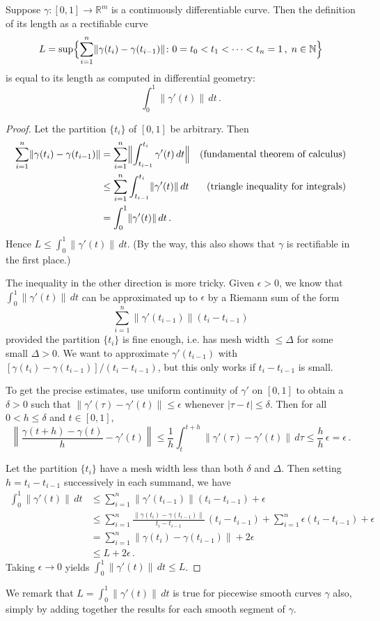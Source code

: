 \documentclass[12pt]{article}
\newcommand{\real}{\mathbb{R}}
\newcommand{\nat}{\mathbb{N}}
\providecommand{\abs}[1]{\lvert#1\rvert}
\providecommand{\norm}[1]{\lVert#1\rVert}
\providecommand{\normW}[1]{\left\lVert#1\right\rVert}
\providecommand{\normB}[1]{\Bigl\lVert#1\Bigr\rVert}
\begin{document}
Suppose $\gamma\colon [0,1] \to \real^m$ 
is a continuously differentiable
 curve.  Then the definition of its length
as a rectifiable curve
\[
L = \sup \Bigl\{ \sum_{i=1}^n \norm{\gamma(t_i) - \gamma(t_{i-1})} 
\colon 0 = t_0 < t_1 < \dotsb < t_n = 1 \,, \thickspace n \in \nat \Bigr\} 
\]
is equal to its length as computed in differential geometry:
\[
\int_0^1 \norm{\gamma'(t)} \, dt\,.
\]

\begin{proof}
Let the partition $\{ t_i \}$ of $[0,1]$ be arbitrary.  Then
\begin{align*}
\sum_{i=1}^n \norm{\gamma(t_i) - \gamma(t_{i-1})} &= \sum_{i=1}^n \normB{\int_{t_{i -1}}^{t_i} \gamma'(t) \, dt } &  \text{(fundamental theorem of calculus)} \\
&\leq \sum_{i=1}^n \int_{t_{i -1}}^{t_i} \norm{\gamma'(t)} \, dt 
&\text{(triangle inequality for integrals)} \\
&= \int_0^1 \norm{\gamma'(t)} \, dt\,.
\end{align*}
Hence $L \leq \int_0^1 \norm{\gamma'(t)} \, dt$.
(By the way, this also shows that $\gamma$ is rectifiable in the first place.)

The inequality in the other direction is more tricky.
Given $\epsilon > 0$, we know that
$\int_0^1 \norm{\gamma'(t)} \, dt$ can be approximated up to $\epsilon$
by a Riemann sum of the form
\[
\sum_{i=1}^n \norm{ \gamma'(t_{i-1}) } (t_i - t_{i-1})
\]
provided the partition $\{ t_i \}$ is fine enough,
i.e. has mesh width $\leq \Delta$ for some small $\Delta > 0$.
We want to approximate $\gamma'(t_{i-1})$ with 
$[\gamma(t_i) - \gamma(t_{i-1})]/(t_i - t_{i-1})$, but this only works 
if $t_i - t_{i-1}$ is small.  

To get the precise estimates, use uniform continuity 
of $\gamma'$ on $[0,1]$ to obtain a $\delta > 0$ such that 
$\norm{\gamma'(\tau) - \gamma'(t)} \leq \epsilon$ 
whenever $\abs{\tau - t} \leq \delta$.  
Then for all $0 < h \leq \delta$ and $t \in [0,1]$,
\[
\normW{ \frac{\gamma(t+h) - \gamma(t)}{h} - \gamma'(t) }
\leq \frac{1}{h} \int_t^{t+h} \norm{\gamma'(\tau) - \gamma'(t)} \, d\tau
\leq \frac{h}{h} \, \epsilon = \epsilon\,.
\]

Let the partition $\{t_i\}$ have a mesh width less than both $\delta$
and $\Delta$.  Then
setting $h = t_i - t_{i-1}$ successively in each summand,
we have
\begin{align*}
\int_0^1 \norm{\gamma'(t)} \, dt &\leq 
\sum_{i=1}^n \norm{\gamma'(t_{i-1})} (t_i - t_{i-1}) + \epsilon \\
&\leq \sum_{i=1}^n \frac{\norm{\gamma(t_i) - \gamma(t_{i-1})}}{t_i - t_{i-1}}
\, (t_i - t_{i-1}) + \sum_{i=1}^n \epsilon (t_i - t_{i-1}) + \epsilon \\
&= \sum_{i=1}^n \norm{\gamma(t_i) - \gamma(t_{i-1})} + 2\epsilon \\
&\leq L + 2\epsilon\,.
\end{align*}
Taking $\epsilon \to 0$ yields  $\int_0^1 \norm{\gamma'(t)} \, dt \leq L$.
\end{proof}

We remark that $L = \int_0^1 \norm{\gamma'(t)} \, dt$ is true  for piecewise smooth curves $\gamma$
also, simply by adding together the results for each smooth segment of $\gamma$.
\end{document}
